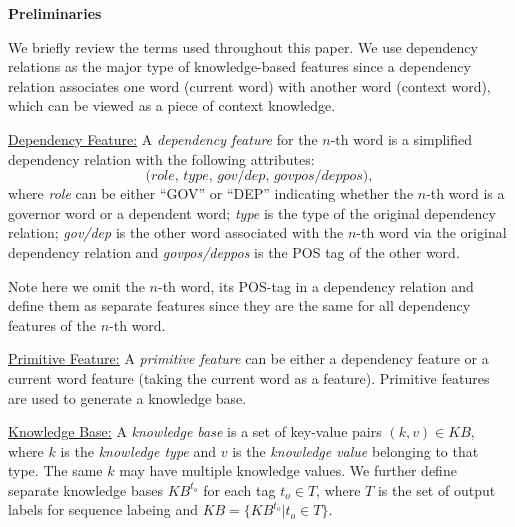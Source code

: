 \textbf{Preliminaries}

We briefly review the terms used throughout this paper. We use dependency relations as the major type of knowledge-based features since a dependency relation associates one word (current word) with another word (context word), which can be viewed as a piece of context knowledge.


\underline{Dependency Feature:} \label{chap6:defn:df} 
A \emph{dependency feature} for the $n$-th word is a simplified dependency relation with the following attributes:
$$\textit{(role, type, gov/dep, govpos/deppos)}, $$
where \emph{role} can be either ``GOV'' or ``DEP'' indicating whether the $n$-th word is a governor word or a dependent word; \emph{type} is the type of the original dependency relation; \emph{gov/dep} is the other word associated with the $n$-th word via the original dependency relation and \emph{govpos/deppos} is the POS tag of the other word.

Note here we omit the $n$-th word, its POS-tag in a dependency relation and define them as separate features since they are the same for all dependency features of the $n$-th word. 

\underline{Primitive Feature:} \label{chap6:defn:pf} 
A \emph{primitive feature} can be either a dependency feature or a current word feature (taking the current word as a feature). Primitive features are used to generate a knowledge base.

\underline{Knowledge Base:} \label{chap6:defn:kb} 
A \emph{knowledge base} is a set of key-value pairs $(k, v) \in \textit{KB}$, where $k$ is the \emph{knowledge type} and $v$ is the \emph{knowledge value} belonging to that type. The same $k$ may have multiple knowledge values. We further define separate knowledge bases $\textit{KB}^{t_o}$ for each tag $t_o \in T$, where $T$ is the set of output labels for sequence labeing and $\textit{KB}=\{\textit{KB}^{t_o}|t_o \in T\}$.

